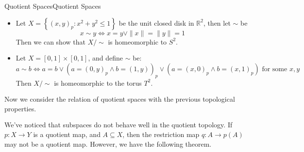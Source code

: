 \documentclass[../main.tex]{subfiles}
\begin{document}
\begin{example}{Quotient Spaces}{Quotient Spaces}
\begin{itemize}
\item Let $X = \left\{ (x,y)_p: x^2+y^2 \leq 1 \right\}$ be the unit closed disk in $\mathbb{R}^2$, then let $\sim$ be
	\begin{equation*}
	x\sim y \Leftrightarrow x=y\lor \|x\| = \|y\| = 1
	\end{equation*}
	Then we can show that $X / \sim$ is homeomorphic to $S^2$.
\item Let $X = [0,1] \times [0,1]$, and define $\sim$ be:
	\begin{equation*}
	a\sim b \Leftrightarrow a=b\lor (a=(0,y)_p\land b=(1,y))_p\lor (a=(x,0)_p\land b=(x,1)_p) \text{ for some }x,y
	\end{equation*}
	Then $X / \sim$ is homeomorphic to the torus $T^2$.
\end{itemize}
\end{example}

Now we consider the relation of quotient spaces with the previous topological properties.

We've noticed that subspaces do not behave well in the quotient topology. If $p: X \rightarrow Y$ is a quotient map, and $A \subseteq X$, then the restriction map $q: A \rightarrow p(A)$ may not be a quotient map. However, we have the following theorem.
\end{document}
